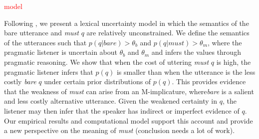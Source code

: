 \documentclass[11pt]{article}
\newcommand{\red}[1]{\textcolor{Red}{#1}}
\begin{document}
\red{model}

Following \cite{bergen, lassiter}, we present a lexical uncertainty model in which the semantics of the bare utterance and \textit{must} $q$ are relatively unconstrained. We define the semantics of the utterances such that $p(q | \textit{bare} ) > \theta_b$ and $p(q | \textit{must} ) > \theta_m$, where the pragmatic listener is uncertain about $\theta_b$ and $\theta_m$ and infers the values through pragmatic reasoning. We show that when the cost of uttering \textit{must} $q$ is high, the pragmatic listener infers that $p(q)$ is smaller than when the utterance is the less costly \textit{bare} $q$ under certain prior distributions of $p(q)$. This provides evidence that the weakness of \textit{must} can arise from an M-implicature, where\textit{bare} is a salient and less costly alternative utterance. Given the weakened certainty in $q$, the listener may then infer that the speaker has indirect or imperfect evidence of $q$. Our empirical results and computational model  support this account and provide a new perspective on the meaning of \textit{must} (conclusion needs a lot of work).  
%
\end{document}

